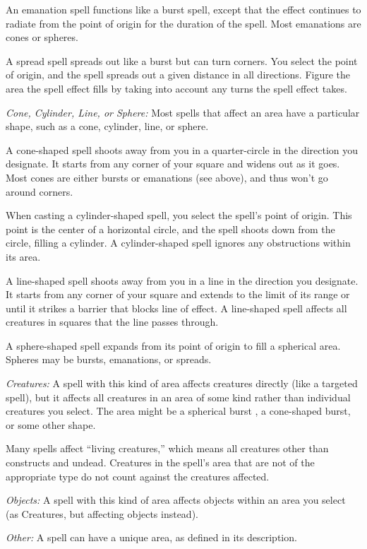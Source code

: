 \documentclass{article}
\begin{document}
An emanation spell functions like a burst spell, except that the effect continues 
to radiate from the point of origin for the duration of the spell. Most emanations 
are cones or spheres.

A spread spell spreads out like a burst but can turn corners. You select the point 
of origin, and the spell spreads out a given distance in all directions. Figure 
the area the spell effect fills by taking into account any turns the spell effect 
takes.

\textit{Cone, Cylinder, Line, or Sphere: }Most spells that affect an area have 
a particular shape, such as a cone, cylinder, line, or sphere.

A cone-shaped spell shoots away from you in a quarter-circle in the direction you 
designate. It starts from any corner of your square and widens out as it goes. 
Most cones are either bursts or emanations (see above), and thus won't go around 
corners.

When casting a cylinder-shaped spell, you select the spell's point of origin. This 
point is the center of a horizontal circle, and the spell shoots down from the 
circle, filling a cylinder. A cylinder-shaped spell ignores any obstructions within 
its area.

A line-shaped spell shoots away from you in a line in the direction you designate. 
It starts from any corner of your square and extends to the limit of its range 
or until it strikes a barrier that blocks line of effect. A line-shaped spell affects 
all creatures in squares that the line passes through.

A sphere-shaped spell expands from its point of origin to fill a spherical area. 
Spheres may be bursts, emanations, or spreads.

\textit{Creatures: }A spell with this kind of area affects creatures directly (like 
a targeted spell), but it affects all creatures in an area of some kind rather 
than individual creatures you select. The area might be a spherical burst , a cone-shaped 
burst, or some other shape.

Many spells affect ``living creatures,'' which means all creatures other than constructs 
and undead. Creatures in the spell's area that are not of the appropriate type 
do not count against the creatures affected.

\textit{Objects: }A spell with this kind of area affects objects within an area 
you select (as Creatures, but affecting objects instead).

\textit{Other: }A spell can have a unique area, as defined in its description.
\end{document}

